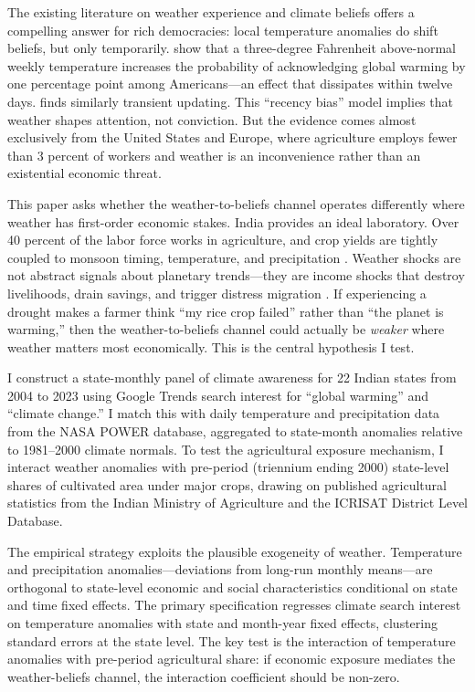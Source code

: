 \documentclass[12pt]{article}
\begin{document}
The existing literature on weather experience and climate beliefs offers a compelling answer for rich democracies: local temperature anomalies do shift beliefs, but only temporarily. \citet{eganmullin2012} show that a three-degree Fahrenheit above-normal weekly temperature increases the probability of acknowledging global warming by one percentage point among Americans---an effect that dissipates within twelve days. \citet{deryugina2013} finds similarly transient updating. This ``recency bias'' model implies that weather shapes attention, not conviction. But the evidence comes almost exclusively from the United States and Europe, where agriculture employs fewer than 3 percent of workers and weather is an inconvenience rather than an existential economic threat.

This paper asks whether the weather-to-beliefs channel operates differently where weather has first-order economic stakes. India provides an ideal laboratory. Over 40 percent of the labor force works in agriculture, and crop yields are tightly coupled to monsoon timing, temperature, and precipitation \citep{guiteras2009}. Weather shocks are not abstract signals about planetary trends---they are income shocks that destroy livelihoods, drain savings, and trigger distress migration \citep{jayachandran2006}. If experiencing a drought makes a farmer think ``my rice crop failed'' rather than ``the planet is warming,'' then the weather-to-beliefs channel could actually be \textit{weaker} where weather matters most economically. This is the central hypothesis I test.

I construct a state-monthly panel of climate awareness for 22 Indian states from 2004 to 2023 using Google Trends search interest for ``global warming'' and ``climate change.'' I match this with daily temperature and precipitation data from the NASA POWER database, aggregated to state-month anomalies relative to 1981--2000 climate normals. To test the agricultural exposure mechanism, I interact weather anomalies with pre-period (triennium ending 2000) state-level shares of cultivated area under major crops, drawing on published agricultural statistics from the Indian Ministry of Agriculture and the ICRISAT District Level Database.

The empirical strategy exploits the plausible exogeneity of weather. Temperature and precipitation anomalies---deviations from long-run monthly means---are orthogonal to state-level economic and social characteristics conditional on state and time fixed effects. The primary specification regresses climate search interest on temperature anomalies with state and month-year fixed effects, clustering standard errors at the state level. The key test is the interaction of temperature anomalies with pre-period agricultural share: if economic exposure mediates the weather-beliefs channel, the interaction coefficient should be non-zero.
\end{document}
